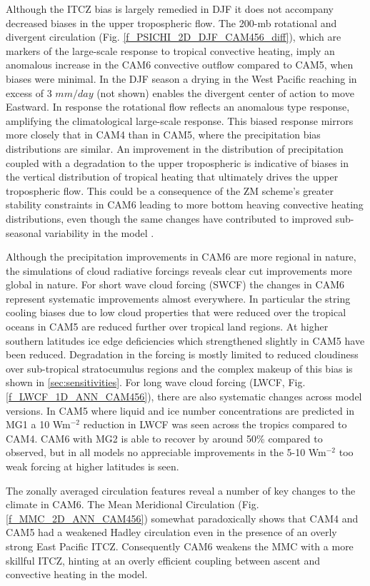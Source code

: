 Although the ITCZ bias is largely remedied in DJF it does not accompany decreased biases in the upper tropospheric flow. The 200-mb rotational and divergent circulation (Fig. \ref{f_PSICHI_2D_DJF_CAM456_diff}), which are markers of the large-scale response to tropical convective heating, imply an anomalous increase in the CAM6 convective outflow compared to CAM5, when biases were minimal. In the DJF season a drying in the West Pacific reaching in excess of 3 $mm/day$ (not shown) enables the divergent center of action to move Eastward. In response the rotational flow reflects an anomalous \citep{Gill1980} type response, amplifying the climatological large-scale response. This biased response mirrors more closely that in CAM4 than in CAM5, where the precipitation bias distributions are similar. An improvement in the distribution of precipitation coupled with a degradation to the upper tropospheric is indicative of biases in the vertical distribution of tropical heating that ultimately drives the upper tropospheric flow. This could be a consequence of the ZM scheme's greater stability constraints in CAM6 leading to more bottom heaving convective heating distributions, even though the same changes have contributed to improved sub-seasonal variability in the model \citep{Danabasoglu2020,Meehl2020}.

Although the precipitation improvements in CAM6 are more regional in nature, the simulations of cloud radiative forcings reveals clear cut improvements more global in nature. For short wave cloud forcing (SWCF) the changes in CAM6 represent systematic improvements almost everywhere. In particular the string cooling biases due to low cloud properties that were reduced over the tropical oceans in CAM5 are reduced further over tropical land regions. At higher southern latitudes ice edge deficiencies which strengthened slightly in CAM5 have been reduced. Degradation in the forcing is mostly limited to reduced cloudiness over sub-tropical stratocumulus regions and the complex makeup of this bias is shown in \ref{sec:sensitivities}. For long wave cloud forcing (LWCF, Fig. \ref{f_LWCF_1D_ANN_CAM456}), there are also systematic changes across model versions. In CAM5 where liquid and ice number concentrations are predicted in MG1 a 10 Wm$^{-2}$ reduction in LWCF was seen across the tropics compared to CAM4. CAM6 with MG2 is able to recover by around 50\% compared to observed, but in all models no appreciable improvements in the 5-10 Wm$^{-2}$ too weak forcing at higher latitudes is seen. 

The zonally averaged circulation features reveal a number of key changes to the climate in CAM6. The Mean Meridional Circulation (Fig. \ref{f_MMC_2D_ANN_CAM456}) somewhat paradoxically shows that CAM4 and CAM5 had a weakened Hadley circulation even in the presence of an overly strong East Pacific ITCZ. Consequently CAM6 weakens the MMC with a more skillful ITCZ, hinting at an overly efficient coupling between ascent and convective heating in the model. 

